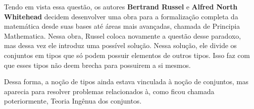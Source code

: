 \documentclass[../main.tex]{subfiles}
\begin{document}
Tendo em vista essa questão, os autores \textbf{Bertrand Russel} e \textbf{Alfred North Whitehead} decidem desenvolver uma obra para a formalização completa da matemática desde suas bases até áreas mais avançadas, chamada de Principia Mathematica. Nessa obra, Russel coloca novamente a questão desse paradoxo, mas dessa vez ele introduz uma possível solução. Nessa solução, ele divide os conjuntos em tipos que só podem possuir elementos de outros tipos. Isso faz com que esses tipos não deem brecha para possuirem a si mesmos.


Dessa forma, a noção de tipos ainda estava vinculada à noção de conjuntos, mas aparecia para resolver problemas relacionados à, como ficou chamada poteriormente, Teoria Ingênua dos conjuntos.
\end{document}
